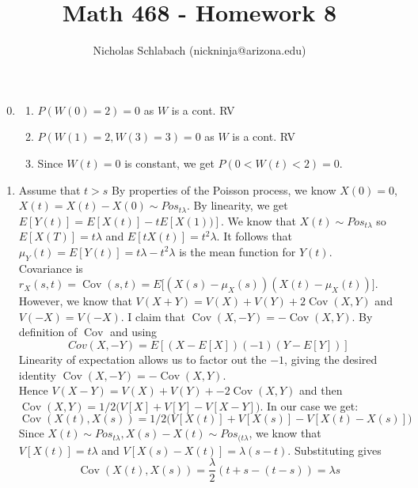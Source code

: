 \documentclass[14pt,letterpaper]{extarticle}
\title{Math 468 - Homework 8}
\author{Nicholas Schlabach (nickninja@arizona.edu)}
\date{\DTMUsedate{titledate}}
\newcommand*{\Cov}{\operatorname{Cov}}
\begin{document}
\pagestyle{fancy}
\fancyhead[C]{\hspace{5mm}\Big(\thetitle{}\Big)}
\fancyfoot{} %
\maketitle
\thispagestyle{fancy}


\begin{center}
\begin{enumerate}
\setcounter{enumi}{-1}
\item
    \begin{enumerate}
    \item $P(W(0)=2)=0$ as $W$ is a cont. RV
    \item $P(W(1)=2,W(3)=3)=0$ as $W$ is a cont. RV
    \item 
        Since $W(t)=0$ is constant, we get $P(0<W(t)<2)=0$.
    \end{enumerate}
    \item
        Assume that $t>s$
        By properties of the Poisson process, we know $X(0)=0$, $X(t)= X(t)-X(0)\sim Pos_{t\lambda}$. By linearity, we get $E[Y(t)]=E[X(t)]-tE[X(1))]$.
        We know that $X(t)\sim Pos_{t\lambda}$ so $E[X(T)]=t\lambda$ and $E[tX(t)]=t^2\lambda$.
        It follows that $\mu_Y(t)=E[Y(t)]=t\lambda-t^2\lambda$ is the mean function for $Y(t)$. \\
        Covariance is $r_X(s,t)=\Cov(s,t)=E\big[(X(s)-\mu_X(s))(X(t)-\mu_X(t))\big]$. 
        However, we know that $V(X+Y)=V(X)+V(Y)+2\Cov(X,Y)$ and $V(-X)=V(-X)$. I claim that $\Cov(X,-Y)=-\Cov(X,Y)$. By definition of $\Cov$ and using        \[ Cov(X,-Y)=E[(X-E[X])(-1)(Y-E[Y])] \]
        Linearity of expectation allows us to factor out the $-1$, giving the desired identity $\Cov(X,-Y)=-\Cov(X,Y)$. \\
        Hence $V(X-Y)=V(X)+V(Y)+-2\Cov(X,Y)$ and then $\Cov(X,Y)=1/2\big(V[X]+V[Y]-V[X-Y]\big)$.
        In our case we get:
        \[ \Cov(X(t),X(s))=1/2\Big(V[X(t)]+V[X(s)]-V[X(t)-X(s)]\Big) \]
        Since $X(t)\sim Pos_{t\lambda},X(s)-X(t)\sim Pos_{(t\lambda}$, we know that $V[X(t)]=t\lambda$ and $V[X(s)-X(t)]=\lambda(s-t)$. Substituting gives
        \[ \Cov(X(t),X(s))=\frac{\lambda}{2}(t+s-(t-s))=\lambda s \]

\end{enumerate}
\end{center}
\end{document}
